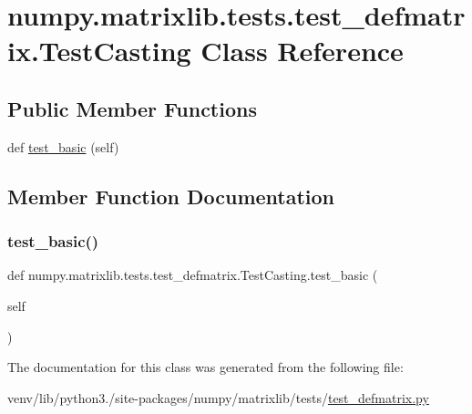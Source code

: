 \hypertarget{classnumpy_1_1matrixlib_1_1tests_1_1test__defmatrix_1_1TestCasting}{}\section{numpy.\+matrixlib.\+tests.\+test\+\_\+defmatrix.\+Test\+Casting Class Reference}
\label{classnumpy_1_1matrixlib_1_1tests_1_1test__defmatrix_1_1TestCasting}
\subsection*{Public Member Functions}
\begin{DoxyCompactItemize}
\item 
def \hyperlink{classnumpy_1_1matrixlib_1_1tests_1_1test__defmatrix_1_1TestCasting_ab45e0d881147fc813d4c5ae4b65c8dfb}{test\+\_\+basic} (self)
\end{DoxyCompactItemize}


\subsection{Member Function Documentation}
\mbox{\label{classnumpy_1_1matrixlib_1_1tests_1_1test__defmatrix_1_1TestCasting_ab45e0d881147fc813d4c5ae4b65c8dfb}} 
\subsubsection{\texorpdfstring{test\+\_\+basic()}{test\_basic()}}
{\footnotesize\ttfamily def numpy.\+matrixlib.\+tests.\+test\+\_\+defmatrix.\+Test\+Casting.\+test\+\_\+basic (\begin{DoxyParamCaption}\item[{}]{self }\end{DoxyParamCaption})}



The documentation for this class was generated from the following file\+:\begin{DoxyCompactItemize}
\item 
venv/lib/python3./site-\/packages/numpy/matrixlib/tests/\hyperlink{test__defmatrix_8py}{test\+\_\+defmatrix.\+py}\end{DoxyCompactItemize}
